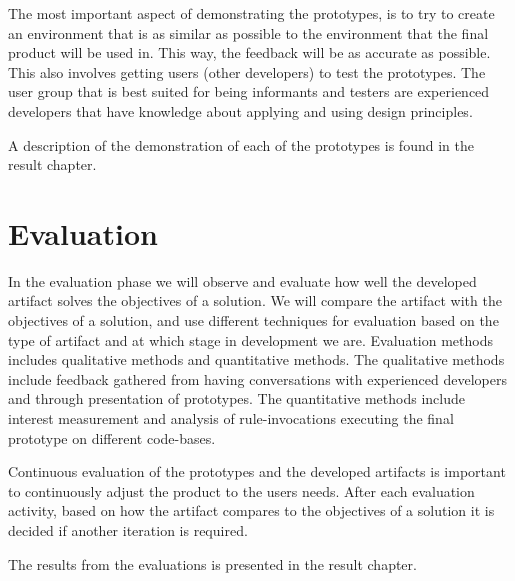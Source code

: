 \documentclass[pdftex,10pt,b5paper,twoside]{report}
\begin{document}
The most important aspect of demonstrating the prototypes, is to try to create an environment that is as similar as possible to the environment that the final product will be used in. This way, the feedback will be as accurate as possible. This also involves getting users (other developers) to test the prototypes. The user group that is best suited for being informants and testers are experienced developers that have knowledge about applying and using design principles.


A description of the demonstration of each of the prototypes is found in the result chapter. 

\section{Evaluation}
In the evaluation phase we will observe and evaluate how well the developed artifact solves the objectives of a solution. We will compare the artifact with the objectives of a solution, and use different techniques for evaluation based on the type of artifact and at which stage in development we are. Evaluation methods includes qualitative methods and quantitative methods. The qualitative methods include feedback gathered from having conversations with experienced developers and through presentation of prototypes. The quantitative methods include interest measurement and analysis of rule-invocations executing the final prototype on different code-bases.  

Continuous evaluation of the prototypes and the developed artifacts is important to continuously adjust the product to the users needs. After each evaluation activity, based on how the artifact compares to the objectives of a solution it is decided if another iteration is required.

The results from the evaluations is presented in the result chapter.
\end{document}
